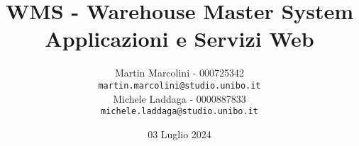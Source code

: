 
\begin{titlepage}
    \title{\LARGE WMS - Warehouse Master System \\[10pt] \large Applicazioni e Servizi Web}
    \author{
        Martin Marcolini - 000725342 \\ \texttt{martin.marcolini@studio.unibo.it} \\[10pt]
        Michele Laddaga - 0000887833 \\ \texttt{michele.laddaga@studio.unibo.it}
    }
    \date{03 Luglio 2024}
    \maketitle
\end{titlepage}
